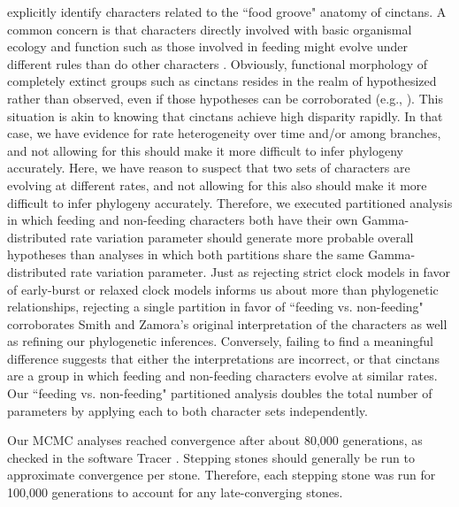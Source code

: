 \documentclass{article}
\begin{document}
\citet{SmithZamora2009} explicitly identify characters related to the ``food groove" anatomy of cinctans. A common concern is that characters directly involved with basic organismal ecology and function such as those involved in feeding might evolve under different rules than do other characters \citep{Foote1994,Foote1996a,Wagner1995,Sanchez-Villagra1998,Ciampaglio2002,HopkinsSmith2015, Wright2017}. Obviously, functional morphology of completely extinct groups such as cinctans resides in the realm of hypothesized rather than observed, even if those hypotheses can be corroborated (e.g., \citealp{RahmanEtAl2020}). This situation is akin to knowing that cinctans achieve high disparity rapidly. In that case, we have evidence for rate heterogeneity over time and/or among branches, and not allowing for this should make it more difficult to infer phylogeny accurately. Here, we have reason to suspect that two sets of characters are evolving at different rates, and not allowing for this also should make it more difficult to infer phylogeny accurately. Therefore, we executed partitioned analysis in which feeding and non-feeding characters both have their own Gamma-distributed rate variation parameter should generate more probable overall hypotheses than analyses in which both partitions share the same Gamma-distributed rate variation parameter. Just as rejecting strict clock models in favor of early-burst or relaxed clock models informs us about more than phylogenetic relationships, rejecting a single partition in favor of ``feeding vs. non-feeding" corroborates Smith and Zamora's original interpretation of the characters as well as refining our phylogenetic inferences. Conversely, failing to find a meaningful difference suggests that either the interpretations are incorrect, or that cinctans are a group in which feeding and non-feeding characters evolve at similar rates. Our ``feeding vs. non-feeding" partitioned analysis doubles the total number of parameters by applying each to both character sets independently.

Our MCMC analyses reached convergence after about 80,000 generations, as checked in the software Tracer \citep{Rambaut2018}. 
Stepping stones should generally be run to approximate convergence per stone.
Therefore, each stepping stone was run for 100,000 generations to account for any late-converging stones.
\end{document}
